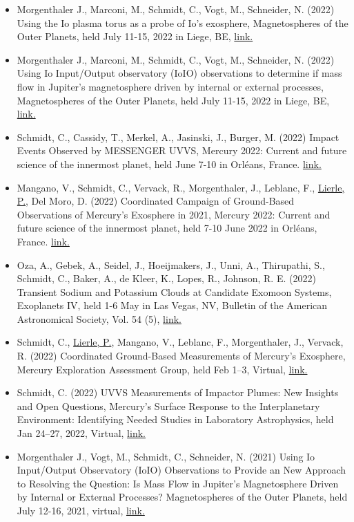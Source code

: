 \documentclass[12pt]{report}
\begin{document}
\begin{itemize}
   \item Morgenthaler J., Marconi, M., Schmidt, C., Vogt, M., Schneider, N. (2022) Using the Io plasma torus as a probe of Io's exosphere,  Magnetospheres of the Outer Planets, held July 11-15, 2022 in Liege, BE, \href{ https://www.mop.uliege.be/}{link.}
   \item Morgenthaler J., Marconi, M., Schmidt, C., Vogt, M., Schneider, N. (2022)  Using Io Input/Output observatory (IoIO) observations to determine if mass flow in Jupiter's magnetosphere driven by internal or external processes, Magnetospheres of the Outer Planets, held July 11-15, 2022 in Liege, BE, \href{ https://www.mop.uliege.be/}{link.}
   \item Schmidt, C., Cassidy, T., Merkel, A., Jasinski, J., Burger, M. (2022) Impact Events Observed by MESSENGER UVVS, Mercury 2022: Current and future science of the innermost planet, held June 7-10 in Orl\'eans, France. \href{https://mercury2020.ias.u-psud.fr/main_1st.php}{link.} 
   \item Mangano, V., Schmidt, C., Vervack, R., Morgenthaler, J., Leblanc, F., \underline{Lierle, P.}, Del Moro, D. (2022) Coordinated Campaign of Ground-Based Observations of Mercury’s Exosphere in 2021, Mercury 2022: Current and future science of the innermost planet, held 7-10 June 2022 in Orl\'eans, France. \href{https://mercury2020.ias.u-psud.fr/main_1st.php}{link.} 
   \item Oza, A., Gebek, A., Seidel, J., Hoeijmakers, J., Unni, A., Thirupathi, S., Schmidt, C., Baker, A., de Kleer, K., Lopes, R., Johnson, R.  E. (2022) Transient Sodium and Potassium Clouds at Candidate Exomoon Systems, Exoplanets IV, held 1-6 May in Las Vegas, NV, Bulletin of the American Astronomical Society, Vol. 54 (5), \href{https://baas.aas.org/pub/2022n5i208p02}{link.} 
   \item Schmidt, C., \underline{Lierle, P.}, Mangano, V., Leblanc, F., Morgenthaler, J., Vervack, R. (2022) Coordinated Ground-Based Measurements of Mercury’s Exosphere, Mercury Exploration Assessment Group, held Feb 1–3, Virtual, \href{https://www.hou.usra.edu/meetings/mexagfebruary2022/eposter/9007.pdf}{link.} 
   \item Schmidt, C. (2022) UVVS Measurements of Impactor Plumes: New Insights and Open Questions, Mercury’s Surface Response to the Interplanetary Environment: Identifying Needed Studies in Laboratory Astrophysics, held Jan 24–27, 2022, Virtual, \href{https://meeting.psi.edu/mercurylab2022/}{link.} 
   \item Morgenthaler J., Vogt, M., Schmidt, C., Schneider, N. (2021) Using Io Input/Output Observatory (IoIO) Observations to Provide an New Approach to Resolving the Question: Is Mass Flow in Jupiter's Magnetosphere Driven by Internal or External Processes? Magnetospheres of the Outer Planets, held July 12-16, 2021, virtual, \href{https://www.mop.uliege.be/upload/docs/application/pdf/2021-06/mop21_conference_booklet.pdf}{link.} 

\end{itemize}
\end{document}
